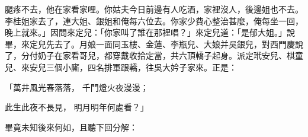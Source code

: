 腿疼不去，他在家看家哩。你姑夫今日前邊有人吃酒，家裡沒人，後邊姐也不去。李桂姐家去了，連大姐、銀姐和俺每六位去。你家少費心整治甚麼，俺每坐一回，晚上就來。」因問來定兒：「你家叫了誰在那裡唱？」來定兒道：「是郁大姐。」說畢，來定兒先去了。月娘一面同玉樓、金蓮、李瓶兒、大娘并吳銀兒，對西門慶說了，分付奶子在家看哥兒，都穿戴收拾定當，共六頂轎子起身。派定玳安兒、棋童兒、來安兒三個小廝，四名排軍跟轎，往吳大妗子家來。正是：

「萬井風光春落落，  千門燈火夜漫漫；

此生此夜不長見，  明月明年何處看？」

畢竟未知後來何如，且聽下回分解：
